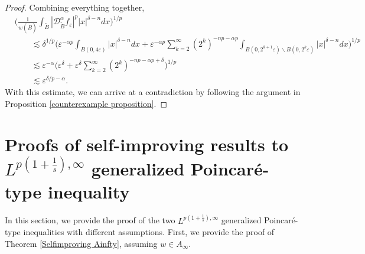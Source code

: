 \documentclass[reqno, 10pt, oneside]{amsart}
\numberwithin{equation}{section}
\renewcommand{\epsilon}{\varepsilon}
\numberwithin{theorem}{section}
\renewcommand{\epsilon}{\varepsilon}
\newcommand{\1}{{\rm 1\hspace*{-0.4ex}%
\rule{0.1ex}{1.52ex}\hspace*{0.2ex}}}
\begin{document}
\begin{proof}
Combining everything together,
\begin{align}
&\Big(\frac{1}{w(\widetilde{B})}\int_{\widetilde{B}}|\mathcal{D}^{\alpha}_{\widetilde{B}} f_\epsilon|^p |x|^{\delta -n}dx\Big)^{1/p} \nonumber \\
& \qquad \lesssim  \delta^{1/p}\Big(\epsilon^{-\alpha p}\int_{B(0,4\epsilon)} |x|^{\delta -n}dx + \epsilon^{-\alpha p}\sum\limits_{k=2}^{\infty}(2^k)^{-np-\alpha p}\int_{B(0,2^{k+1}\epsilon) \backslash B(0,2^k\epsilon)} |x|^{\delta -n}dx\Big)^{1/p} \nonumber \\
& \qquad \lesssim  \epsilon^{-\alpha}  \Big( \epsilon^{\delta} + \epsilon^{\delta}\sum\limits_{k=2}^{\infty}(2^k)^{-np-\alpha p + \delta}\Big)^{1/p} \\
& \qquad \lesssim \epsilon^{\delta/p - \alpha} \nonumber.
\end{align}
With this estimate, we can arrive at a contradiction by following the argument in Proposition {\ref{counterexample proposition}}.
\end{proof}




\section{Proofs of self-improving results to \texorpdfstring{$L^{p(1+\frac{1}{s}),\infty}$}{L{p(1+1/s),inf}} generalized Poincaré-type inequality}\label{Section 4}


In this section, we provide the proof of the two $L^{p(1+\frac{1}{s}),\infty}$ generalized Poincaré-type inequalities with different assumptions. First, we provide the proof of Theorem \ref{Selfimproving Ainfty}, assuming $w\in A_\infty$. 
\end{document}
